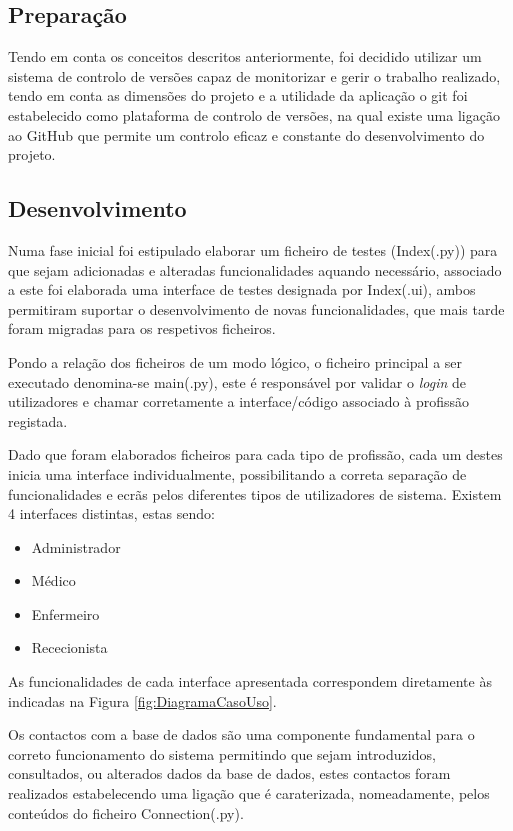 \documentclass[11pt,a4paper,twoside]{report}
\begin{document}
	
	\subsection{Preparação}
	
	Tendo em conta os conceitos descritos anteriormente, foi decidido utilizar um sistema de controlo de versões capaz de monitorizar e gerir o trabalho realizado, tendo em conta as dimensões do projeto e a utilidade da aplicação o git foi estabelecido como plataforma de controlo de versões, na qual existe uma ligação ao GitHub que permite um controlo eficaz e constante do desenvolvimento do projeto.
	
	
	\subsection{Desenvolvimento}
	
	Numa fase inicial foi estipulado elaborar um ficheiro de testes (Index(.py)) para que sejam adicionadas e alteradas funcionalidades aquando necessário, associado a este foi elaborada uma interface de testes designada por Index(.ui), ambos permitiram suportar o desenvolvimento de novas funcionalidades, que mais tarde foram migradas para os respetivos ficheiros.
	
	Pondo a relação dos ficheiros de um modo lógico, o ficheiro principal a ser executado denomina-se main(.py), este é responsável por validar o \textit{login} de utilizadores e chamar corretamente a interface/código associado à profissão registada.
	
	Dado que foram elaborados ficheiros para cada tipo de profissão, cada um destes inicia uma interface individualmente, possibilitando a correta separação de funcionalidades e ecrãs pelos diferentes tipos de utilizadores de sistema.
	Existem 4 interfaces distintas, estas sendo:
	\begin{itemize}
		\item Administrador
		\item Médico
		\item Enfermeiro
		\item Rececionista
	\end{itemize}

	As funcionalidades de cada interface apresentada correspondem diretamente às indicadas na Figura \ref{fig:DiagramaCasoUso}.
	
	Os contactos com a base de dados são uma componente fundamental para o correto funcionamento do sistema permitindo que sejam introduzidos, consultados, ou alterados dados da base de dados, estes contactos foram realizados estabelecendo uma ligação que é caraterizada, nomeadamente, pelos conteúdos do ficheiro Connection(.py).
	
\end{document}
